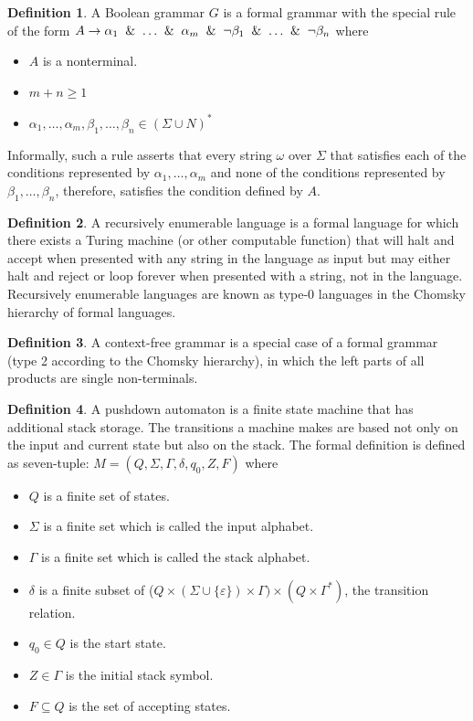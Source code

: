 \documentclass[conference]{IEEEtran}
\theoremstyle{definition}
\newtheorem{defn}{Definition}[section]
\begin{document}
\begin{defn}
A Boolean grammar $G$ is a formal grammar with the special rule of the form
$\\A\to \alpha_{1}\And \ldots \And \alpha_{m}\And \lnot \beta_{1}\And \ldots \And \lnot \beta_{n}$ where
\begin{itemize}
    \item $A$ is a nonterminal.
    \item $m+n\geq 1$
    \item $\alpha_{1}, \dots, \alpha_{m}, \beta_{1}, \dots, \beta_{n} \in (\Sigma \cup N)^*$
\end{itemize}
Informally, such a rule asserts that every string $\omega$ over $\Sigma$
that satisfies each of the conditions represented by $\alpha_{1}, \dots, \alpha_{m}$
and none of the conditions represented by $\beta_{1}, \dots, \beta_{n}$,
therefore, satisfies the condition defined by $A$.
\end{defn}

\begin{defn}
A recursively enumerable language is a formal language for which there exists a Turing machine
(or other computable function) that will halt and accept when presented with any string
in the language as input but may either halt and reject or loop forever when presented
with a string, not in the language. Recursively enumerable languages are known as type-0
languages in the Chomsky hierarchy of formal languages.
\end{defn}

\begin{defn}
A context-free grammar is a special case of a formal grammar
(type 2 according to the Chomsky hierarchy), in which the left parts of all
products are single non-terminals.
\end{defn}

\begin{defn}
A pushdown automaton is a finite state machine that has additional stack storage. The transitions a machine makes are based not only on the input and current state but also on the stack. The formal definition is defined as seven-tuple:
$M=(Q,\Sigma ,\Gamma ,\delta ,q_{0},Z,F)$ where
\begin{itemize}
    \item $Q$ is a finite set of states.
    \item $\Sigma$ is a finite set which is called the input alphabet.
    \item $\Gamma$ is a finite set which is called the stack alphabet.
    \item $\delta$ is a finite subset of ($Q \times (\Sigma \cup \{\varepsilon \})\times \Gamma) \times (Q\times \Gamma^{*})$, the transition relation.
    \item $q_{0}\in Q$ is the start state.
    \item $Z\in \Gamma$ is the initial stack symbol.
    \item $F\subseteq Q$ is the set of accepting states.
\end{itemize}
\end{defn}
\end{document}
